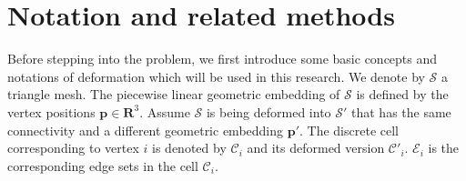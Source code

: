 
\section{Notation and related methods}
Before stepping into the problem, we first introduce some basic concepts and notations of deformation which will be used in this research. We denote by $\mathcal S$ a triangle mesh. The piecewise linear geometric embedding of $\mathcal S$ is defined by the vertex positions $ \mathbf{p} \in \mathbf R^3$. Assume $\mathcal S$ is being deformed into $\mathcal S'$ that has the same connectivity and a different geometric embedding $\mathbf{p'}$. The discrete cell corresponding to vertex $i$ is denoted by $\mathcal  C_i$ and its deformed version $\mathcal  C'_i$. $\mathcal{E}_i$ is the corresponding edge sets in the cell $\mathcal  C_i$.

